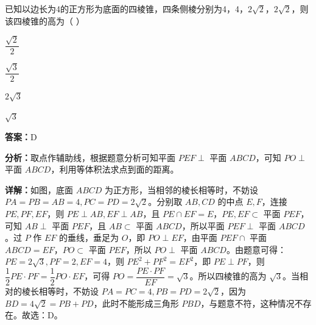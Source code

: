 \begin{question}[points=4]
已知以边长为4的正方形为底面的四棱锥，四条侧棱分别为4，4，$2\sqrt{2}$，$2\sqrt{2}$，则该四棱锥的高为（ ）
\begin{choices}
  \item $\dfrac{\sqrt{2}}{2}$
  \item $\dfrac{\sqrt{3}}{2}$
  \item $2\sqrt{3}$
  \item $\sqrt{3}$
\end{choices}
\begin{solution}
\textbf{答案：}D

\textbf{分析：}取点作辅助线，根据题意分析可知平面 $PEF \perp$ 平面 $ABCD$，可知 $PO \perp$ 平面 $ABCD$，利用等体积法求点到面的距离。

\textbf{详解：}如图，底面 $ABCD$ 为正方形，当相邻的棱长相等时，不妨设 $PA=PB=AB=4, PC=PD=2\sqrt{2}$。分别取 $AB, CD$ 的中点 $E,F$，连接 $PE, PF, EF$，则 $PE \perp AB, EF \perp AB$，且 $PE \cap EF = E$，$PE, EF \subset$ 平面 $PEF$，可知 $AB \perp$ 平面 $PEF$，且 $AB \subset$ 平面 $ABCD$，所以平面 $PEF \perp$ 平面 $ABCD$。过 $P$ 作 $EF$ 的垂线，垂足为 $O$，即 $PO \perp EF$，由平面 $PEF \cap$ 平面 $ABCD = EF$，$PO \subset$ 平面 $PEF$，所以 $PO \perp$ 平面 $ABCD$。由题意可得：$PE=2\sqrt{3}, PF=2, EF=4$，则 $PE^2+PF^2=EF^2$，即 $PE \perp PF$，则 $\dfrac{1}{2} PE \cdot PF = \dfrac{1}{2} PO \cdot EF$，可得 $PO = \dfrac{PE \cdot PF}{EF} = \sqrt{3}$。所以四棱锥的高为 $\sqrt{3}$。当相对的棱长相等时，不妨设 $PA=PC=4, PB=PD=2\sqrt{2}$，因为 $BD=4\sqrt{2}=PB+PD$，此时不能形成三角形 $PBD$，与题意不符，这种情况不存在。故选：D。
\end{solution}
\end{question}

